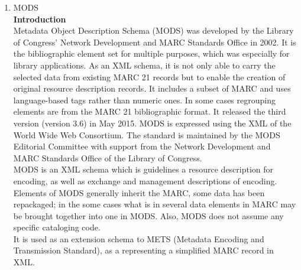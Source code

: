 \begin{enumerate}
	
	\item MODS\\
	{\bf Introduction}\\
	Metadata Object Description Schema (MODS) was developed by the Library of Congress' Network Development and MARC Standards Office in 2002. 
	It is the bibliographic element set for multiple purposes, which was especially for library applications. 
	As an XML schema, it is not only able to carry the selected data from existing MARC 21 records but to enable the creation of original resource description records. 
	It includes a subset of MARC and uses language-based tags rather than numeric ones. In some cases regrouping elements are from the MARC 21 bibliographic format. 
	It released the third version (version 3.6) in May 2015. MODS is expressed using the XML of the World Wide Web Consortium. 
	The standard is maintained by the MODS Editorial Committee with support from the Network Development and MARC Standards Office of the Library of Congress.\\
	
	MODS is an XML schema which is guidelines a resource description for encoding, as well as exchange and management descriptions of encoding.\\
	
	Elements of MODS generally inherit the MARC, some data has been repackaged; in the some cases what is in several data elements in MARC may be brought together into one in MODS. Also, MODS does not assume any specific cataloging code.\\ 
	It is used as an extension schema to METS (Metadata Encoding and Transmission Standard), as a representing a simplified MARC record in XML.
	

\end{enumerate}
